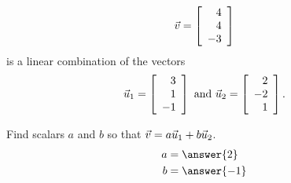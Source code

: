 \documentclass{ximera}
\author{Zack Reed}
\begin{document}
\begin{exercise}

\begin{equation*}
  \vect{v}= \startmat{r}
    4 \\
    4 \\
    -3
  \stopmat
\end{equation*}
is a linear combination of the vectors
\begin{equation*}
  \vect{u}_1 = \startmat{r}
    3 \\
    1 \\
    -1
  \stopmat
  \quad\text{and}\quad
  \vect{u}_2 =
  \startmat{r}
    2 \\
    -2 \\
    1
  \stopmat.
\end{equation*}

  Find scalars $a$ and $b$ so that $\vect{v} = a\vect{u}_1 + b\vect{u}_2$.
  \begin{align*}
    a &= \answer{2} \\
    b &= \answer{-1}
  \end{align*}

\end{exercise}
\end{document}
